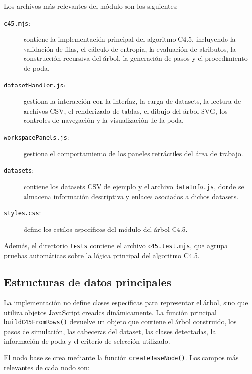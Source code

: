 Los archivos más relevantes del módulo son los siguientes:

\begin{description}
    \item[\texttt{c45.mjs}:] contiene la implementación principal del algoritmo C4.5, incluyendo la validación de filas, el cálculo de entropía, la evaluación de atributos, la construcción recursiva del árbol, la generación de pasos y el procedimiento de poda.
    \item[\texttt{datasetHandler.js}:] gestiona la interacción con la interfaz, la carga de datasets, la lectura de archivos CSV, el renderizado de tablas, el dibujo del árbol SVG, los controles de navegación y la visualización de la poda.
    \item[\texttt{workspacePanels.js}:] gestiona el comportamiento de los paneles retráctiles del área de trabajo.
    \item[\texttt{datasets}:] contiene los datasets CSV de ejemplo y el archivo \texttt{dataInfo.js}, donde se almacena información descriptiva y enlaces asociados a dichos datasets.
    \item[\texttt{styles.css}:] define los estilos específicos del módulo del árbol C4.5.
\end{description}

Además, el directorio \texttt{tests} contiene el archivo \texttt{c45.test.mjs}, que agrupa pruebas automáticas sobre la lógica principal del algoritmo C4.5.

\subsection{Estructuras de datos principales}

La implementación no define clases específicas para representar el árbol, sino que utiliza objetos JavaScript creados dinámicamente. La función principal \texttt{buildC45FromRows()} devuelve un objeto que contiene el árbol construido, los pasos de simulación, las cabeceras del dataset, las clases detectadas, la información de poda y el criterio de selección utilizado.

El nodo base se crea mediante la función \texttt{createBaseNode()}. Los campos más relevantes de cada nodo son:

